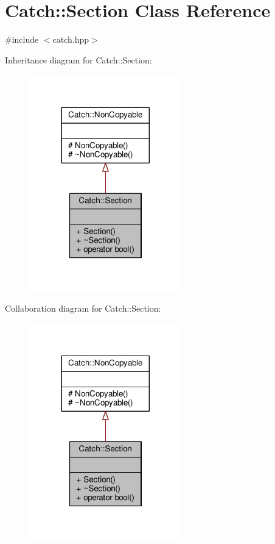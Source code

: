\hypertarget{class_catch_1_1_section}{\section{Catch\-:\-:Section Class Reference}
\label{class_catch_1_1_section}
}


{\ttfamily \#include $<$catch.\-hpp$>$}



Inheritance diagram for Catch\-:\-:Section\-:
\nopagebreak
\begin{figure}[H]
\begin{center}
\leavevmode
\includegraphics[width=188pt]{class_catch_1_1_section__inherit__graph}
\end{center}
\end{figure}


Collaboration diagram for Catch\-:\-:Section\-:
\nopagebreak
\begin{figure}[H]
\begin{center}
\leavevmode
\includegraphics[width=188pt]{class_catch_1_1_section__coll__graph}
\end{center}
\end{figure}

